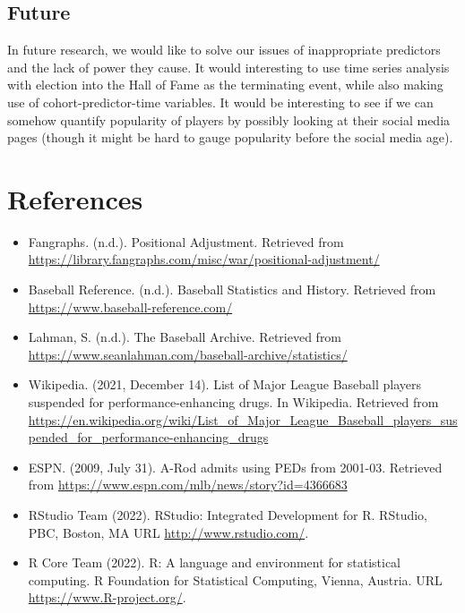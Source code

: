 \documentclass[
]{article}
\providecommand{\tightlist}{%
  \setlength{\itemsep}{0pt}\setlength{\parskip}{0pt}}
\begin{document}
\hypertarget{future}{%
\subsection{Future}\label{future}}

In future research, we would like to solve our issues of inappropriate
predictors and the lack of power they cause. It would interesting to use
time series analysis with election into the Hall of Fame as the
terminating event, while also making use of cohort-predictor-time
variables. It would be interesting to see if we can somehow quantify
popularity of players by possibly looking at their social media pages
(though it might be hard to gauge popularity before the social media
age).

\hypertarget{references}{%
\section{References}\label{references}}

\begin{itemize}
\tightlist
\item
  Fangraphs. (n.d.). Positional Adjustment. Retrieved from
  \url{https://library.fangraphs.com/misc/war/positional-adjustment/}
\item
  Baseball Reference. (n.d.). Baseball Statistics and History. Retrieved
  from \url{https://www.baseball-reference.com/}
\item
  Lahman, S. (n.d.). The Baseball Archive. Retrieved from
  \url{https://www.seanlahman.com/baseball-archive/statistics/}
\item
  Wikipedia. (2021, December 14). List of Major League Baseball players
  suspended for performance-enhancing drugs. In Wikipedia. Retrieved
  from
  \url{https://en.wikipedia.org/wiki/List_of_Major_League_Baseball_players_suspended_for_performance-enhancing_drugs}
\item
  ESPN. (2009, July 31). A-Rod admits using PEDs from 2001-03. Retrieved
  from \url{https://www.espn.com/mlb/news/story?id=4366683}
\item
  RStudio Team (2022). RStudio: Integrated Development for R. RStudio,
  PBC, Boston, MA URL \url{http://www.rstudio.com/}.
\item
  R Core Team (2022). R: A language and environment for statistical
  computing. R Foundation for Statistical Computing, Vienna, Austria.
  URL \url{https://www.R-project.org/}.
\end{itemize}
\end{document}
